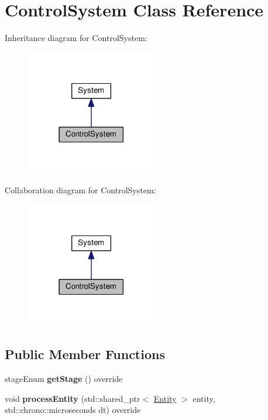 \hypertarget{classControlSystem}{\section{Control\-System Class Reference}
\label{classControlSystem}
}


Inheritance diagram for Control\-System\-:
\nopagebreak
\begin{figure}[H]
\begin{center}
\leavevmode
\includegraphics[width=162pt]{classControlSystem__inherit__graph}
\end{center}
\end{figure}


Collaboration diagram for Control\-System\-:
\nopagebreak
\begin{figure}[H]
\begin{center}
\leavevmode
\includegraphics[width=162pt]{classControlSystem__coll__graph}
\end{center}
\end{figure}
\subsection*{Public Member Functions}
\begin{DoxyCompactItemize}
\item 
\hypertarget{classControlSystem_a0be51ba9211cc5880e2253a64901eb86}{stage\-Enum {\bfseries get\-Stage} () override}\label{classControlSystem_a0be51ba9211cc5880e2253a64901eb86}

\item 
\hypertarget{classControlSystem_a76dd5a8441e30282cc5e1fcacbecf340}{void {\bfseries process\-Entity} (std\-::shared\-\_\-ptr$<$ \hyperlink{classEntity}{Entity} $>$ entity, std\-::chrono\-::microseconds dt) override}\label{classControlSystem_a76dd5a8441e30282cc5e1fcacbecf340}

\end{DoxyCompactItemize}
